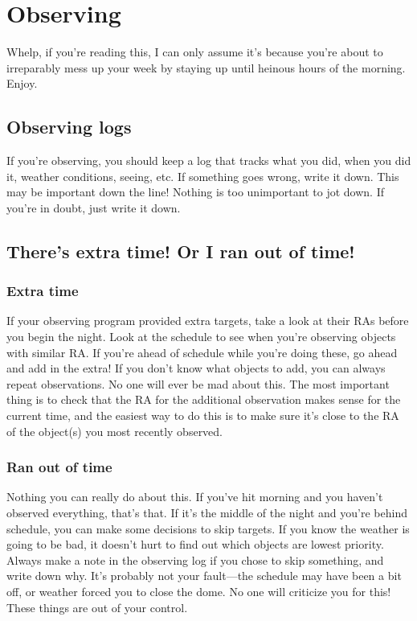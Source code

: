 \section{Observing}
Whelp, if you're reading this, I can only assume it's because you're about to irreparably mess up your week by staying up until heinous hours of the morning. Enjoy. 

\subsection{Observing logs}
If you're observing, you should keep a log that tracks what you did, when you did it, weather conditions, seeing, etc. If something goes wrong, write it down. This may be important down the line! Nothing is too unimportant to jot down. If you're in doubt, just write it down. 

\subsection{There's extra time! Or I ran out of time!}
\subsubsection{Extra time}
If your observing program provided extra targets, take a look at their RAs before you begin the night. Look at the schedule to see when you're observing objects with similar RA. If you're ahead of schedule while you're doing these, go ahead and add in the extra! If you don't know what objects to add, you can always repeat observations. No one will ever be mad about this. The most important thing is to check that the RA for the additional observation makes sense for the current time, and the easiest way to do this is to make sure it's close to the RA of the object(s) you most recently observed. 

\subsubsection{Ran out of time}
Nothing you can really do about this. If you've hit morning and you haven't observed everything, that's that. If it's the middle of the night and you're behind schedule, you can make some decisions to skip targets. If you know the weather is going to be bad, it doesn't hurt to find out which objects are lowest priority. Always make a note in the observing log if you chose to skip something, and write down why. It's probably not your fault---the schedule may have been a bit off, or weather forced you to close the dome. No one will criticize you for this! These things are out of your control. 

